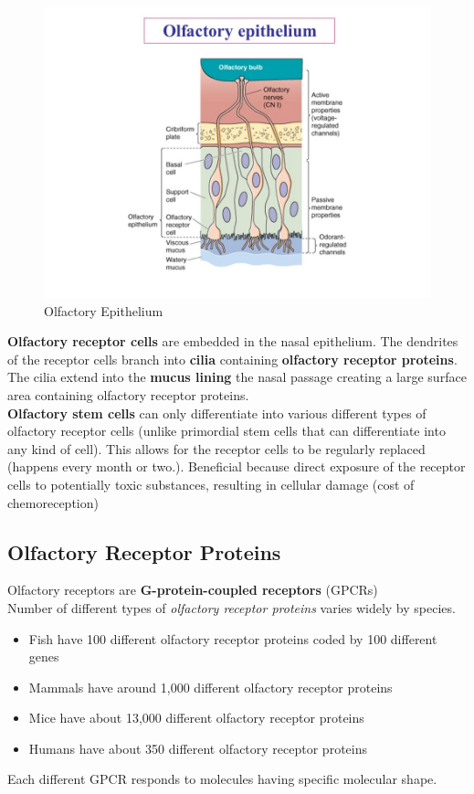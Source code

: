 \documentclass{article}
\begin{document}
\begin{figure}[htp]
\centering
\includegraphics[width=13cm]{images/olfactoryepithelium.jpg}
\caption{Olfactory Epithelium}
\label{fig: OE}
\end{figure}

\textbf{Olfactory receptor cells} are embedded in the nasal epithelium. The dendrites of the receptor cells branch into \textbf{cilia} containing \textbf{olfactory receptor proteins}. The cilia extend into the \textbf{mucus lining} the nasal passage creating a large surface area containing olfactory receptor proteins. \\

\textbf{Olfactory stem cells} can only differentiate into various different types of olfactory receptor cells (unlike primordial stem cells that can differentiate into any kind of cell). This allows for the receptor cells to be regularly replaced (happens every month or two.). Beneficial because direct exposure of the receptor cells to potentially toxic substances, resulting in cellular damage (cost of chemoreception)\\

\subsection{Olfactory Receptor Proteins}
Olfactory receptors are \textbf{G-protein-coupled receptors} (GPCRs) \\
Number of different types of \textit{olfactory receptor proteins} varies widely by species. 
\begin{itemize}
    \item Fish have 100 different olfactory receptor proteins coded by 100 different genes
    \item Mammals have around 1,000 different olfactory receptor proteins
    \item Mice have about 13,000 different olfactory receptor proteins
    \item Humans have about 350 different olfactory receptor proteins
\end{itemize}
Each different GPCR responds to molecules having specific molecular shape. \\
\end{document}
